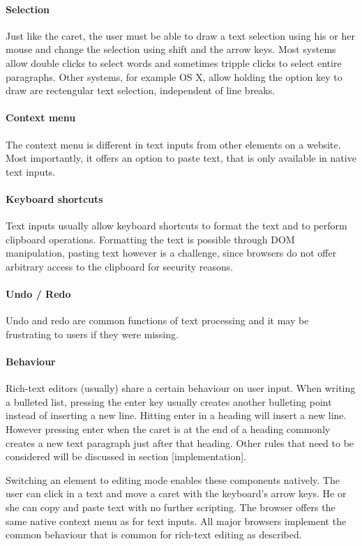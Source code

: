 \paragraph{Selection} Just like the caret, the user must be able to draw a text selection using his or her mouse and change the selection using shift and the arrow keys. Most systems allow double clicks to select words and sometimes tripple clicks to select entire paragraphs. Other systems, for example OS X, allow holding the option key to draw are rectengular text selection, independent of line breaks.

\paragraph{Context menu} The context menu is different in text inputs from other elements on a website. Most importantly, it offers an option to paste text, that is only available in native text inputs.

\paragraph{Keyboard shortcuts} Text inputs usually allow keyboard shortcuts to format the text and to perform clipboard operations. Formatting the text is possible through DOM manipulation, pasting text however is a challenge, since browsers do not offer arbitrary access to the clipboard for security reasons.

\paragraph{Undo / Redo} Undo and redo are common functions of text processing and it may be frustrating to users if they were missing.

\paragraph{Behaviour} Rich-text editors (usually) share a certain behaviour on user input. When writing a bulleted list, pressing the enter key usually creates another bulleting point instead of inserting a new line. Hitting enter in  a heading will insert a new line. However pressing enter when the caret is at the end of a heading commonly creates a new text paragraph just after that heading. Other rules that need to be considered will be discussed in section [implementation].

Switching an element to editing mode enables these components natively. The user can click in a text and move a caret with the keyboard's arrow keys. He or she can copy and paste text with no further scripting. The browser offers the same native context menu as for text inputs. All major browsers implement the common behaviour that is common for rich-text editing as described.

